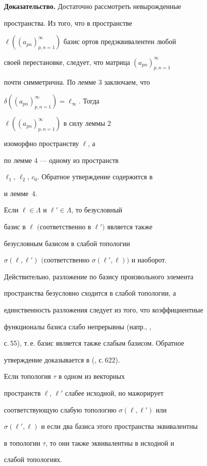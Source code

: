 {\bf Доказательство.} Достаточно рассмотреть невырожденные


пространства. Из того, что в пространстве


$\ell((a_{pn})^\infty_{p,n=1})$ базис ортов предэквивалентен любой


своей перестановке, следует, что матрица $(a_{pn})^\infty_{p,n=1}$


почти симметрична. По лемме 3 заключаем, что


$\delta((a_{pn})^\infty_{p,n=1})=\ell_\infty$. Тогда


$\ell((a_{pn})^\infty_{p,n=1})$ в силу леммы 2


изоморфно пространству $\ell$, а


по лемме 4 --- одному из пространств


$\ell_1$, $\ell_2$, $c_0$. Обратное утверждение содержится в


\cite{5Dr80} и лемме~4.





\begin{lem}


Если $\ell\in\Lambda$ и $\ell'\in\Lambda$, то безусловный


базис в $\ell$ $($соответственно в $\ell')$ является также


безусловным базисом в слабой топологии


$\sigma(\ell,\ell')$ $($соответственно $\sigma(\ell',\ell))$ и наоборот.


\end{lem}





\medskip


Действительно, разложение по базису произвольного элемента


пространства безусловно сходится в слабой топологии, а


единственность разложения следует из того, что коэффициентные


функционалы базиса слабо непрерывны (напр., \cite{2RR},


с.\,55), т.\,е. базис является также слабым базисом. Обратное


утверждение доказывается в (\cite{13Ed}, с.\,622).





\begin{cor}


Если топология $\tau$ в одном из векторных


пространств $\ell$, $\ell'$ слабее исходной, но мажорирует


соответствующую слабую топологию $\sigma(\ell,\ell')$ или


$\sigma(\ell',\ell)$ и если два базиса этого пространства эквивалентны


в топологии $\tau$, то они также эквивалентны в исходной и


слабой топологиях.


\end{cor}





